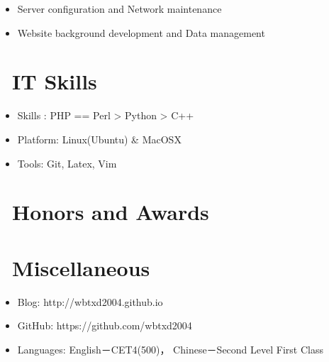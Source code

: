 \documentclass{resume}
\begin{document}
\begin{itemize}
  \item Server configuration and Network maintenance
  \item Website background development and Data management
\end{itemize}


\section{\faCogs\ IT Skills}
\begin{itemize}[parsep=0.5ex]
  \item Skills : PHP == Perl > Python > C++
  \item Platform: Linux(Ubuntu) \& MacOSX
  \item Tools: Git, Latex,  Vim
\end{itemize}

\section{\faHeartO\ Honors and Awards}

\section{\faInfo\ Miscellaneous}
\begin{itemize}[parsep=0.5ex]
  \item Blog: http://wbtxd2004.github.io
  \item GitHub: https://github.com/wbtxd2004
  \item Languages: English－CET4(500)， Chinese－Second Level First Class
\end{itemize}

%
%
\end{document}
